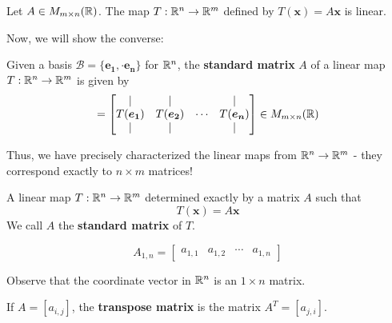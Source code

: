 \begin{theorem}
    Let $A \in M_{m \times n}(\mathbb{R})$.  The map $T : \mathbb{R}^n \to \mathbb{R}^m$ defined by $T(\bm{x}) = A\bm{x}$ is linear.
    \end{theorem}

Now, we will show the converse:

\begin{definition}
    Given a basis $\mathcal{B} = \{\bm{e_1}, \cdot \bm{e_n}\}$ for $\mathbb{R}^n$, the \textbf{standard matrix} $A$ of a linear map $T: \mathbb{R}^n \to \mathbb{R}^m$ is given by
    \begin{equation*}
[A] = 
\begin{bmatrix}
\vert & \vert & & \vert \\
    T(\bm{e_1})   & T(\bm{e_2}) & \cdots & T(\bm{e_n})  \\
    \vert & \vert & & \vert
\end{bmatrix} \in M_{m \times n}(\R)
\end{equation*}
\end{definition}

    Thus, we have precisely characterized the linear maps from $\mathbb{R}^n \to \mathbb{R}^m$ - they correspond exactly to $n \times m$ matrices!
    
    \begin{theorem}
    A linear map $T: \mathbb{R}^n \to \mathbb{R}^m$ determined exactly by a matrix $A$ such that $$T(\bm{x}) = A\bm{x}$$  
    We call $A$ the \textbf{standard matrix} of $T$.
    \end{theorem}



\begin{example}\label{coordinatematrix}
    \begin{equation*}
A_{1,n} = 
\begin{bmatrix}
a_{1,1} & a_{1,2} & \cdots & a_{1,n} 
\end{bmatrix}
\end{equation*}

Observe that the coordinate vector in $\mathbb{R}^n$ is an $1 \times n$ matrix.
    \end{example}


\begin{definition}\label{transpose}
If $A = [a_{i,j}]$, the \textbf{transpose matrix} is the matrix $A^T = [a_{j,i}]$.
\end{definition}








